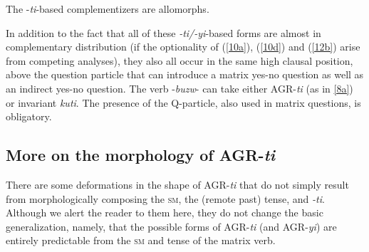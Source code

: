 \documentclass[output=paper,
modfonts
]{langscibook}
\begin{document}
\ea \label{18} \textup{The -\textit{ti}-based complementizers are allomorphs}. \z

In addition to the fact that all of these \textit{-ti/-yi}-based forms are almost in complementary distribution (if the optionality of (\ref{10a}),  (\ref{10d}) and (\ref{12b}) arise from competing analyses), they also all occur in the same high clausal position, above the question particle that can introduce a matrix yes-no question as well as an indirect yes-no question. The verb -\textit{buzw}- can take either AGR-\textit{ti} (as in \ref{8a}) or invariant \textit{kuti}. The presence of the Q-particle, also used in matrix questions, is obligatory.

\ea
{}



\z\z

\subsection{More on the morphology of AGR-\textit{ti}}

There are some deformations in the shape of AGR-\textit{ti} that do not simply result from morphologically composing the \textsc{sm}, the (remote past) tense, and \textit{-ti}. Although we alert the reader to them here, they do not change the basic generalization, namely, that the possible forms of AGR-\textit{ti} (and AGR-\textit{yi}) are entirely predictable from the \textsc{sm} and tense of the matrix verb. 
\end{document}

